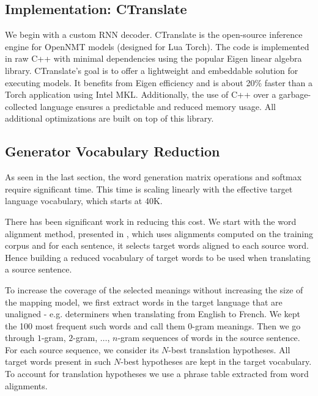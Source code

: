 \documentclass[11pt,a4paper]{article}
\begin{document}
\subsection{Implementation: CTranslate}

We begin with a custom RNN decoder.  CTranslate is the open-source
inference engine for OpenNMT models (designed for Lua Torch).  The
code is implemented in raw C++ with minimal dependencies using the
popular Eigen linear algebra library. CTranslate's goal is to offer a
lightweight and embeddable solution for executing models. It benefits
from Eigen efficiency and is about 20\% faster than a Torch
application using Intel MKL. Additionally, the use of C++ over a
garbage-collected language ensures a predictable and reduced memory
usage. All additional optimizations are built on top of this library.


\subsection{Generator Vocabulary Reduction}

As seen in the last section, the word generation matrix operations and softmax require significant time. This time is scaling linearly with the effective target language vocabulary, which starts at 40K.

There has been significant work in reducing this cost. We start with the word alignment method, presented in , which uses alignments computed on the training corpus and for each sentence, it selects target words aligned to each source word. Hence building a reduced vocabulary of target words to be used when translating a source sentence.


To increase the coverage of the selected meanings without increasing the size of the mapping model, we first extract words in the target language that are unaligned - e.g. determiners when translating from English to French. We kept the 100 most frequent such words and call them $0$-gram meanings. Then we go through $1$-gram, $2$-gram, $\ldots$, $n$-gram sequences of words in the source sentence. For each source sequence, we consider its $N$-best translation hypotheses. All target words present in such $N$-best hypotheses are kept in the target vocabulary. To account for translation hypotheses we use a phrase table extracted from word alignments.
\end{document}
